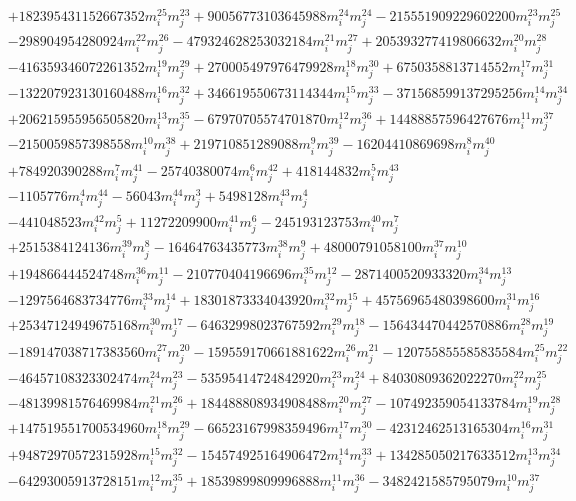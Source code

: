 {\begin{align*}
&+182395431152667352m_i^{25}m_j^{23}+90056773103645988m_i^{24}m_j^{24}-215551909229602200m_i^{23}m_j^{25}\\
&-298904954280924m_i^{22}m_j^{26}-479324628253032184m_i^{21}m_j^{27}+205393277419806632m_i^{20}m_j^{28}\\
&-416359346072261352m_i^{19}m_j^{29}+270005497976479928m_i^{18}m_j^{30}+6750358813714552m_i^{17}m_j^{31}\\
&-132207923130160488m_i^{16}m_j^{32}+346619550673114344m_i^{15}m_j^{33}-371568599137295256m_i^{14}m_j^{34}\\
&+206215955956505820m_i^{13}m_j^{35}-67970705574701870m_i^{12}m_j^{36}+14488857596427676m_i^{11}m_j^{37}\\
&-2150059857398558m_i^{10}m_j^{38}+219710851289088m_i^{9}m_j^{39}-16204410869698m_i^{8}m_j^{40}\\
&+784920390288m_i^{7}m_j^{41}-25740380074m_i^{6}m_j^{42}+418144832m_i^{5}m_j^{43}\\
&-1105776m_i^{4}m_j^{44}-56043m_i^{44}m_j^{3}+5498128m_i^{43}m_j^{4}\\
&-441048523m_i^{42}m_j^{5}+11272209900m_i^{41}m_j^{6}-245193123753m_i^{40}m_j^{7}\\
&+2515384124136m_i^{39}m_j^{8}-16464763435773m_i^{38}m_j^{9}+48000791058100m_i^{37}m_j^{10}\\
&+194866444524748m_i^{36}m_j^{11}-210770404196696m_i^{35}m_j^{12}-2871400520933320m_i^{34}m_j^{13}\\
&-1297564683734776m_i^{33}m_j^{14}+18301873334043920m_i^{32}m_j^{15}+45756965480398600m_i^{31}m_j^{16}\\
&+25347124949675168m_i^{30}m_j^{17}-64632998023767592m_i^{29}m_j^{18}-156434470442570886m_i^{28}m_j^{19}\\
&-189147038717383560m_i^{27}m_j^{20}-159559170661881622m_i^{26}m_j^{21}-120755855585835584m_i^{25}m_j^{22}\\
&-46457108323302474m_i^{24}m_j^{23}-53595414724842920m_i^{23}m_j^{24}+84030809362022270m_i^{22}m_j^{25}\\
&-48139981576469984m_i^{21}m_j^{26}+184488808934908488m_i^{20}m_j^{27}-107492359054133784m_i^{19}m_j^{28}\\
&+147519551700534960m_i^{18}m_j^{29}-66523167998359496m_i^{17}m_j^{30}-42312462513165304m_i^{16}m_j^{31}\\
&+94872970572315928m_i^{15}m_j^{32}-154574925164906472m_i^{14}m_j^{33}+134285050217633512m_i^{13}m_j^{34}\\
&-64293005913728151m_i^{12}m_j^{35}+18539899809996888m_i^{11}m_j^{36}-3482421585795079m_i^{10}m_j^{37}\\

\end{align*}}
